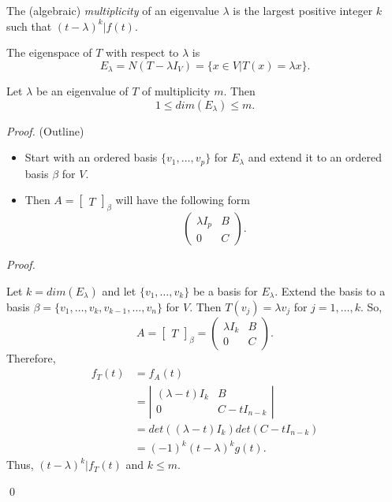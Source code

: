 \documentclass[12pt]{article}
\newenvironment{theorem}[2][Theorem]{\begin{trivlist}
\item[\hskip \labelsep {\bfseries #1}\hskip \labelsep {\bfseries #2.}]}{\end{trivlist}}
\newenvironment{definition}[2][Definition]{\begin{trivlist}
\item[\hskip \labelsep {\bfseries #1}\hskip \labelsep {\bfseries #2}]}{\end{trivlist}}
\newenvironment{sol}
    {\emph{Proof.}
    }
    {
    \qed
    }
\begin{document}
\begin{definition}{5}
The (algebraic) \textit{multiplicity} of an eigenvalue $\lambda$ is the largest positive integer $k$ such that $(t - \lambda)^k | f(t)$.
\end{definition}

\noindent The eigenspace of $T$ with respect to $\lambda$ is $$E_\lambda = N(T - \lambda I_V) = \{x \in V | T(x) = \lambda x\}.$$

\begin{theorem}{5.7}
Let $\lambda$ be an eigenvalue of $T$ of multiplicity $m$. Then $$1 \leq dim(E_\lambda) \leq m.$$
\end{theorem}

\textit{Proof.} (Outline)
\begin{itemize}
    \item Start with an ordered basis $\{v_1, \dots, v_p\}$ for $E_\lambda$ and extend it to an ordered basis $\beta$ for $V$.
    
    \item Then $A = \begin{bmatrix} T \end{bmatrix}_\beta$ will have the following form $$\begin{pmatrix}
    \lambda I_p & B \\ 0 & C
    \end{pmatrix}.$$
\end{itemize}

\begin{sol}
Let $k = dim(E_\lambda)$ and let $\{ v_1, \dots, v_k\}$ be a basis for $E_\lambda$. Extend the basis to a basis $\beta = \{v_1, \dots, v_k, v_{k-1}, \dots, v_n\}$ for $V$. Then $T(v_j) = \lambda v_j$ for $j = 1, \dots, k$. So, $$A = \begin{bmatrix}
T
\end{bmatrix}_\beta = \begin{pmatrix}
\lambda I_k & B \\ 0 & C
\end{pmatrix}.$$ Therefore, \begin{align*}
    f_T(t) &= f_A(t) \\
    &= \left|\begin{array}{cc}
        (\lambda - t)I_k & B \\
        0 & C-tI_{n-k}
    \end{array}\right| \\
    &= det((\lambda - t)I_k)det(C - tI_{n-k}) \tag{By Lemma 8} \\
    &= (-1)^k(t - \lambda)^kg(t).
\end{align*} Thus, $(t - \lambda)^k | f_T(t)$ and $k \leq m$.
\end{sol}
\end{document}
